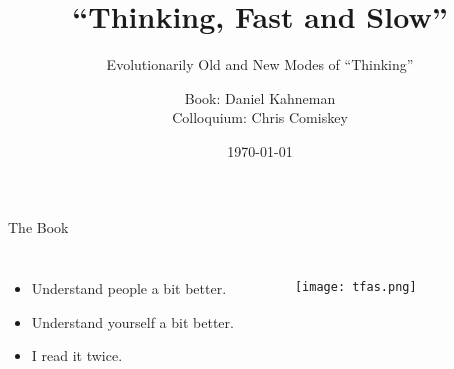 \documentclass{beamer}
\institute{}
\title{``Thinking, Fast and Slow''}
\subtitle{Evolutionarily Old and New Modes of ``Thinking''}
\author{Book: Daniel Kahneman \\ Colloquium: Chris Comiskey}
\date{\today}
\begin{document}
\begin{frame}
  \titlepage
\end{frame}

\begin{frame}{The Book}
\begin{columns}

\begin{itemize}
\addtolength{\itemsep}{0.5\baselineskip}
\item Understand people a bit better.
\item Understand yourself a bit better.
\item I read it twice.
\end{itemize}


    \begin{figure}[H]
  	\centering
  	\texttt{[image: tfas.png]}
  	\end{figure}
  	
\end{columns}

  	
\end{frame}
\end{document}
